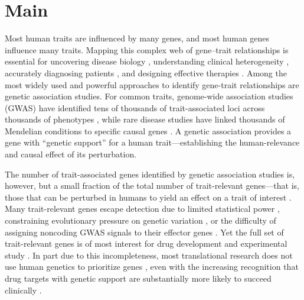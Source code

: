 \section{Main}\label{sec:introduction}


Most human traits are influenced by many genes, and most human genes influence many traits. Mapping this complex web of gene--trait relationships is essential for uncovering disease biology \cite{cohen_sequence_2006}, understanding clinical heterogeneity \cite{udler_type_2018}, accurately diagnosing patients \cite{yang_clinical_2013}, and designing effective therapies \cite{plenge_validating_2013}. Among the most widely used and powerful approaches to identify gene-trait relationships are genetic association studies. For common traits, genome-wide association studies (GWAS) have identified tens of thousands of trait-associated loci across thousands of phenotypes \cite{abdellaoui_15_2023}, while rare disease studies have linked thousands of Mendelian conditions to specific causal genes \cite{chung_meta-analysis_2023}. A genetic association provides a gene with ``genetic support'' for a human trait---establishing the human-relevance and causal effect of its perturbation.

The number of trait-associated genes identified by genetic association studies is, however, but a small fraction of the total number of trait-relevant genes---that is, those that can be perturbed in humans to yield an effect on a trait of interest \cite{finan_druggable_2017}. Many trait-relevant genes escape detection due to limited statistical power \cite{wang_statistical_2019}, constraining evolutionary pressure on genetic variation \cite{gazal_linkage_2017}, or the difficulty of assigning noncoding GWAS signals to their effector genes \cite{schipper_demystifying_2022,costanzo_realizing_2025}. Yet the full set of trait-relevant genes is of most interest for drug development and experimental study \cite{jhamb_pathway_2019,macnamara_network_2020}. In part due to this incompleteness, most translational research does not use human genetics to prioritize genes \cite{wehling_assessing_2009,dornbos_evaluating_2022}, even with the increasing recognition that drug targets with genetic support are substantially more likely to succeed clinically \cite{plenge_validating_2013,minikel_refining_2024}.

